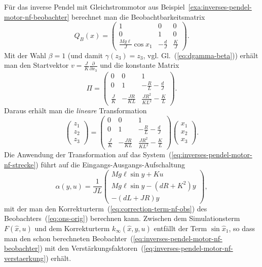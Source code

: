 \begin{example}
Für das inverse Pendel mit Gleichstrommotor aus Beispiel~\ref{exa:inverses-pendel-motor-nf-beobachter}
berechnet man die Beobachtbarkeitsmatrix 
\[
Q_{B}(x)=\left(\begin{array}{ccl}
1 & 0 & 0\\
0 & 1 & 0\\
\frac{Mg\ell}{J}\cos x_{1} & -\frac{d}{J} & \frac{K}{J}
\end{array}\right).
\]
Mit der Wahl $\beta=1$ (und damit $\gamma(z_{3})=z_{3}$, vgl. Gl.~(\ref{eq:dgamma-beta}))
erhält man den Startvektor $v=\tfrac{J}{K}\tfrac{\partial}{\partial x_{3}}$
und die konstante Matrix 
\[
\Pi=\left(\begin{array}{ccc}
0 & 0 & 1\\
0 & 1 & -\frac{R}{L}-\frac{d}{J}\\
\frac{J}{K} & -\frac{JR}{KL} & \frac{JR^{2}}{KL^{2}}-\frac{K}{L}
\end{array}\right).
\]
Daraus erhält man die \textit{lineare} Transformation
\[
\left(\begin{array}{c}
z_{1}\\
z_{2}\\
z_{3}
\end{array}\right)=\left(\begin{array}{ccc}
0 & 0 & 1\\
0 & 1 & -\frac{R}{L}-\frac{d}{J}\\
\frac{J}{K} & -\frac{JR}{KL} & \frac{JR^{2}}{KL^{2}}-\frac{K}{L}
\end{array}\right)\left(\begin{array}{c}
x_{1}\\
x_{2}\\
x_{3}
\end{array}\right).
\]
Die Anwendung der Transformation auf das System~(\ref{eq:inverses-pendel-motor-nf-strecke})
führt auf die Eingangs-Ausgangs-Aufschaltung
\[
\alpha(y,u)=\frac{1}{JL}\left(\begin{array}{c}
Mg\ell\sin y+Ku\\
Mg\ell\sin y-(dR+K^{2})y\\
-(dL+JR)y
\end{array}\right),
\]
mit der man den Korrekturterm~(\ref{eq:correction-term-nf-obs})
des Beobachters~(\ref{eq:ons-orig}) berechnen kann. Zwischen dem
Simulationsterm $F(\hat{x},u)$ und dem Korrekturterm $k_{\infty}(\hat{x},y,u)$
entfällt der Term $\sin\hat{x}_{1}$, so dass man den schon berechneten
Beobachter~(\ref{eq:inverses-pendel-motor-nf-beobachter}) mit den
Verstärkungsfaktoren~(\ref{eq:inverses-pendel-motor-nf-verstaerkung})
erhält.
\end{example}

